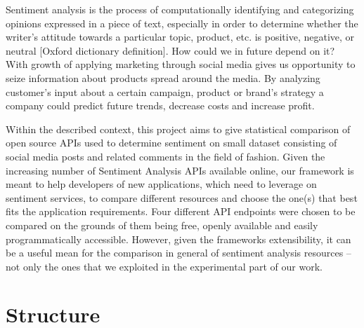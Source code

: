 	Sentiment analysis is the process of computationally identifying and categorizing opinions expressed in a piece of text, especially in order to determine whether the writer's attitude towards a particular topic, product, etc. is positive, negative, or neutral [Oxford dictionary definition]. How could we in future depend on it? With growth of applying marketing through social media gives us opportunity to seize information about products spread around the media. By analyzing customer's input about a certain campaign, product or brand's strategy a company could predict future trends, decrease costs and increase profit.
	
	Within the described context, this project aims to give statistical comparison of open source APIs used to determine sentiment on small dataset consisting of social media posts and related comments in the field of fashion. Given the increasing number of Sentiment Analysis APIs available online, our framework is meant to help developers of new applications, which need to leverage on sentiment services, to compare different resources and choose the one(s) that best fits the application requirements. 
	Four different API endpoints were chosen to be compared on the grounds of them being free, openly available and easily programmatically accessible.
	However, given the frameworks extensibility, it can be a useful mean for the comparison in general of sentiment analysis resources -- not only the ones that we exploited in the experimental part of our work. 

\section{Structure}

